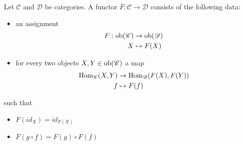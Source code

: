 \begin{defn}
        Let $\mathscr{C}$ and $\mathscr{D}$ be categories. A functor $F:\mathscr{C}\rightarrow\mathscr{D}$ consists of the following data: \begin{itemize}
        \item an assignment 
        \begin{align}
            F:\operatorname{ob}(\mathscr{C})&\rightarrow \operatorname{ob}(\mathscr{D})\\
            X&\mapsto F(X)
        \end{align}
        \item for every two objects $X,Y\in \operatorname{ob}(\mathscr{C})$ a map 
        \begin{align}
            \operatorname{Hom}_{\mathscr{C}}(X,Y)&\rightarrow \operatorname{Hom}_{\mathscr{D}}(F(X),F(Y))\\
            f&\mapsto F(f)
        \end{align}
    \end{itemize} 
    such that 
    \begin{itemize}
        \item $F(id_{X})=id_{F(X)}$
        \item $F(g\circ f)=F(g)\circ F(f)$
    \end{itemize}
\end{defn}


